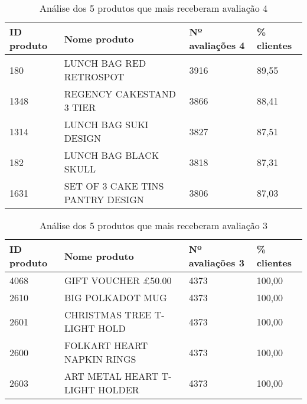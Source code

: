 \vspace{1cm}

\begin{table}[ht]
\centering
\begin{tabular}{@{}llll@{}}
\toprule
\textbf{ID produto} & \textbf{Nome produto}         & \textbf{Nº avaliações 4} & \textbf{\% clientes} \\ \midrule
180                 & LUNCH BAG RED RETROSPOT          & 3916                          & 89,55                       \\
1348                & REGENCY CAKESTAND 3 TIER         & 3866                          & 88,41                       \\
1314                & LUNCH BAG SUKI DESIGN            & 3827                          & 87,51                       \\
182                 & LUNCH BAG BLACK SKULL            & 3818                          & 87,31                       \\
1631                & SET OF 3 CAKE TINS PANTRY DESIGN & 3806                          & 87,03                       \\ \bottomrule
\end{tabular}
\caption{Análise dos 5 produtos que mais receberam avaliação 4}
\label{tab:a4}
\end{table}
\vspace{1cm}

\begin{table}[ht]
\centering
\begin{tabular}{@{}llll@{}}
\toprule
\textbf{ID produto} & \textbf{Nome produto}         & \textbf{Nº avaliações 3} & \textbf{\% clientes} \\ \midrule
4068       & GIFT VOUCHER £50.00  & 4373                 & 100,00             \\
2610       & BIG POLKADOT MUG                    & 4373                 & 100,00             \\
2601       & CHRISTMAS TREE T-LIGHT HOLD & 4373                 & 100,00             \\
2600       & FOLKART HEART NAPKIN RINGS          & 4373                 & 100,00             \\
2603       & ART METAL HEART T-LIGHT HOLDER & 4373                 & 100,00             \\ \bottomrule
\end{tabular}
\caption{Análise dos 5 produtos que mais receberam avaliação 3}
\label{tab:a3}
\end{table}
\vspace{1cm}

